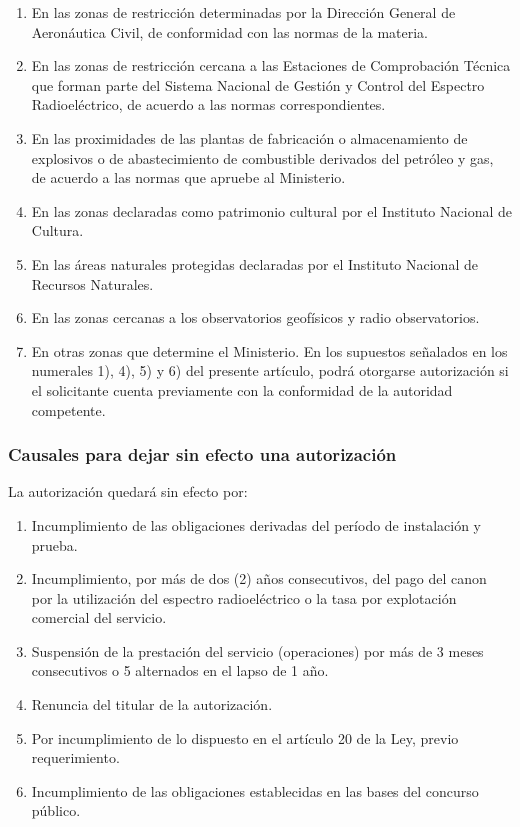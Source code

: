 \documentclass[a4paper]{IEEEtran} %
\begin{document}
\begin{enumerate}
	\item En  las  zonas  de  restricción  determinadas  por 
	la  Dirección  General  de  Aeronáutica  Civil,  de 
	conformidad con las normas de la materia. 
	\item En las zonas de restricción cercana a las 
	Estaciones de Comprobación Técnica que 
	forman  parte  del  Sistema  Nacional  de  Gestión  y 
	Control  del  Espectro  Radioeléctrico,  de  acuerdo 
	a las normas correspondientes. 
	\item En las proximidades de las plantas de 
	fabricación o almacenamiento de explosivos o de 
	abastecimiento de combustible derivados del 
	petróleo  y  gas,  de  acuerdo  a  las  normas  que 
	apruebe al Ministerio. 
	\item En las zonas declaradas como patrimonio 
	cultural por el Instituto Nacional de Cultura. 
	\item En  las  áreas  naturales  protegidas  declaradas 
	por el Instituto Nacional de Recursos Naturales. 
	\item En las zonas cercanas a los observatorios 
	geofísicos y radio observatorios. 
	\item En otras zonas que determine el Ministerio. En  los  supuestos  señalados  en  los  numerales  1), 
	4), 5) y 6) del presente artículo, podrá otorgarse 
	autorización  si  el  solicitante  cuenta  previamente 
	con la conformidad de la autoridad competente. 
\end{enumerate}

\subsubsection{Causales para dejar sin efecto una autorización}

La autorización quedará sin efecto por:
\begin{enumerate}
	\item  Incumplimiento  de  las  obligaciones  derivadas 
	del período de instalación y prueba. 
	\item Incumplimiento,  por más  de  dos  (2)  años 
	consecutivos, del pago del canon por la 
	utilización  del  espectro  radioeléctrico  o  la  tasa 
	por explotación comercial del servicio.  
	\item Suspensión de la prestación del servicio 
	(operaciones) por más de 3 meses consecutivos o 
	5 alternados en el lapso de 1 año.  
	\item Renuncia del titular de la autorización. 
	\item Por incumplimiento de lo dispuesto en el 
	artículo 20 de la Ley, previo requerimiento. 
	\item Incumplimiento de las obligaciones 
	establecidas en las bases del concurso público. 
\end{enumerate}
\end{document}
